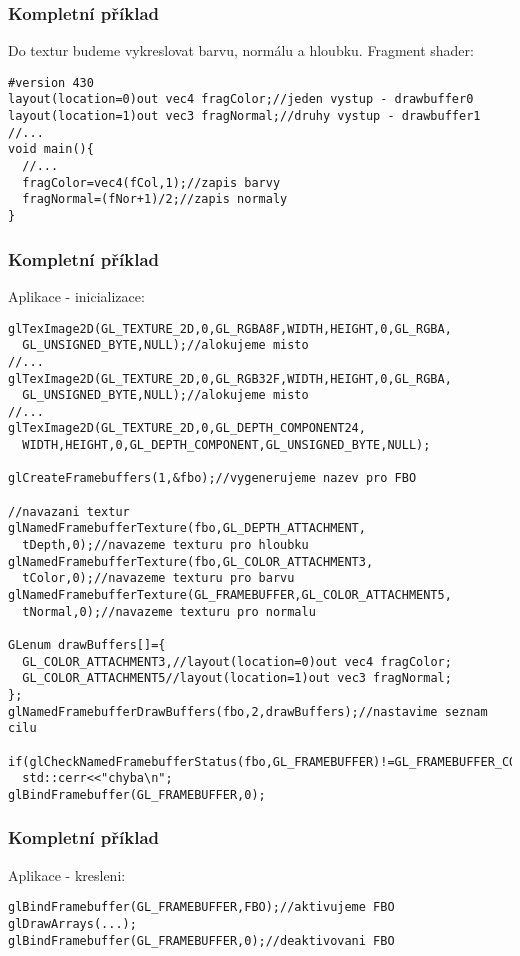 \begin{frame}[fragile]
\frametitle{Kompletní příklad}
    Do textur budeme vykreslovat barvu, normálu a hloubku.
    Fragment shader:
    {\scriptsize
    \begin{verbatim}
#version 430
layout(location=0)out vec4 fragColor;//jeden vystup - drawbuffer0
layout(location=1)out vec3 fragNormal;//druhy vystup - drawbuffer1
//...
void main(){
  //...
  fragColor=vec4(fCol,1);//zapis barvy
  fragNormal=(fNor+1)/2;//zapis normaly
}
    \end{verbatim}
    }
\end{frame}

\begin{frame}[fragile]
\frametitle{Kompletní příklad}
    Aplikace - inicializace:
    {\tiny
    \begin{verbatim}
glTexImage2D(GL_TEXTURE_2D,0,GL_RGBA8F,WIDTH,HEIGHT,0,GL_RGBA,
  GL_UNSIGNED_BYTE,NULL);//alokujeme misto
//...
glTexImage2D(GL_TEXTURE_2D,0,GL_RGB32F,WIDTH,HEIGHT,0,GL_RGBA,
  GL_UNSIGNED_BYTE,NULL);//alokujeme misto
//...
glTexImage2D(GL_TEXTURE_2D,0,GL_DEPTH_COMPONENT24,
  WIDTH,HEIGHT,0,GL_DEPTH_COMPONENT,GL_UNSIGNED_BYTE,NULL);

glCreateFramebuffers(1,&fbo);//vygenerujeme nazev pro FBO

//navazani textur
glNamedFramebufferTexture(fbo,GL_DEPTH_ATTACHMENT,
  tDepth,0);//navazeme texturu pro hloubku
glNamedFramebufferTexture(fbo,GL_COLOR_ATTACHMENT3,
  tColor,0);//navazeme texturu pro barvu
glNamedFramebufferTexture(GL_FRAMEBUFFER,GL_COLOR_ATTACHMENT5,
  tNormal,0);//navazeme texturu pro normalu

GLenum drawBuffers[]={
  GL_COLOR_ATTACHMENT3,//layout(location=0)out vec4 fragColor;
  GL_COLOR_ATTACHMENT5//layout(location=1)out vec3 fragNormal;
};
glNamedFramebufferDrawBuffers(fbo,2,drawBuffers);//nastavime seznam cilu

if(glCheckNamedFramebufferStatus(fbo,GL_FRAMEBUFFER)!=GL_FRAMEBUFFER_COMPLETE)
  std::cerr<<"chyba\n";
glBindFramebuffer(GL_FRAMEBUFFER,0);
    \end{verbatim}
    }
\end{frame}

\begin{frame}[fragile]
\frametitle{Kompletní příklad}
    Aplikace - kresleni:
    {\scriptsize
    \begin{verbatim}
glBindFramebuffer(GL_FRAMEBUFFER,FBO);//aktivujeme FBO
glDrawArrays(...);
glBindFramebuffer(GL_FRAMEBUFFER,0);//deaktivovani FBO
    \end{verbatim}
    }
\end{frame}

